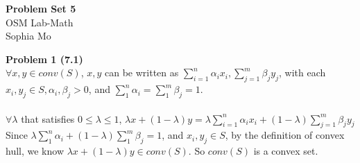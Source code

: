 \documentclass[letterpaper,12pt]{article}
\theoremstyle{definition}
\begin{document}
\begin{flushleft}
  \textbf{\large{Problem Set} 5} \\
  OSM Lab-Math \\
  Sophia Mo
\end{flushleft}

\vspace{5mm}

\noindent\textbf{Problem 1 (7.1)} \\
$\forall x, y \in conv(S)$, $x, y$ can be written as $\sum_{i=1}^n \alpha_ix_i, \sum_{j=1}^m \beta_jy_j$, with each $x_i, y_j\in S, \alpha_i, \beta_j>0$, and $\sum_{1}^n \alpha_i = \sum_{1}^m \beta_j = 1$.\\
\\
$\forall \lambda$ that satisfies $0\leq \lambda \leq 1$, $\lambda x + (1-\lambda)y = \lambda \sum_{i=1}^n \alpha_ix_i + (1 - \lambda)\sum_{j=1}^m \beta_jy_j$\\
Since $\lambda\sum_1^n\alpha_i + (1-\lambda)\sum_1^m\beta_j = 1$, and $x_i, y_j\in S$, by the definition of convex hull, we know $\lambda x + (1-\lambda)y\in conv(S)$. So $conv(S)$ is a convex set.\\
\end{document}

